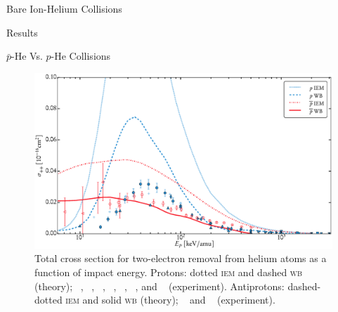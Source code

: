 \documentclass[letterpaper, 11 pt]{report}
\begin{document}
\begin{chapter}{Bare Ion-Helium Collisions \label{chap:p-he2p-he}}
\begin{section}{Results \label{sec:phe2p-res}}
\begin{subsection}{ \texorpdfstring{$\bar{p}$}{pbar}-He Vs. \texorpdfstring{$p$}{p}-He Collisions
                         \label{sec:pbarhe-res}}
         \begin{figure}[t]
            \centering
            \includegraphics[width = 0.95 \linewidth]{./images/pbarhe/pbarhe-++.eps}
            \caption[Total cross section for two-electron removal from helium atoms as a function of
                     impact energy]
                    {Total cross section for two-electron removal from helium atoms as a function
                     of impact energy. Protons: dotted \textsc{iem} and dashed \textsc{wb} (theory);
                     {\color{blue}{$\blacktriangle$}}~\cite{DTR84}, {\color{blue}{$+$}}~\cite{Sol62},
                     {\color{blue}{$\bullet$}}~\cite{SG89},
                     {\color{blue}{$\blacklozenge$}}~\cite{SG85},
                    {\color{blue}{$\blacktriangleright$}}~\cite{PM70},
                    {\color{blue}{$\blacktriangledown$}}~\cite{Wex64}, and
                    {\color{blue}{$\blacksquare$}}~\cite{KAH84} (experiment).
                    Antiprotons: dashed-dotted \textsc{iem} and solid \textsc{wb} (theory);
                    {\color{red}{$\circ$}}~\cite{HKM94} and {\color{red}{$\triangleleft$}}~\cite{KKT09}
                       (experiment). \label{fig:he++}}
         \end{figure}


\end{subsection}
\end{section}
\end{chapter}
\end{document}
